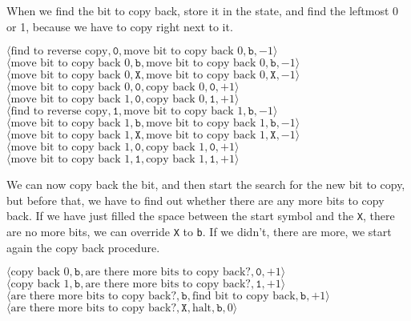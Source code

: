 \documentclass[a4paper,12pt]{article}
\newcommand{\la}{\langle}
\newcommand{\ra}{\rangle}
\begin{document}
    When we find the bit to copy back, store it in the state, and find the leftmost 0 or 1, because we have to copy right next to it.
    \begin{center}
        $\la \textrm{find to reverse copy}, \texttt{0}, \textrm{move bit to copy back 0}, \texttt{b}, -1 \ra$\\
        $\la \textrm{move bit to copy back 0}, \texttt{b}, \textrm{move bit to copy back 0}, \texttt{b}, -1 \ra$\\
        $\la \textrm{move bit to copy back 0}, \texttt{X}, \textrm{move bit to copy back 0}, \texttt{X}, -1 \ra$\\
        $\la \textrm{move bit to copy back 0}, \texttt{0}, \textrm{copy back 0}, \texttt{0}, +1 \ra$\\
        $\la \textrm{move bit to copy back 1}, \texttt{0}, \textrm{copy back 0}, \texttt{1}, +1 \ra$\\
        $\la \textrm{find to reverse copy}, \texttt{1}, \textrm{move bit to copy back 1}, \texttt{b}, -1 \ra$\\
        $\la \textrm{move bit to copy back 1}, \texttt{b}, \textrm{move bit to copy back 1}, \texttt{b}, -1 \ra$\\
        $\la \textrm{move bit to copy back 1}, \texttt{X}, \textrm{move bit to copy back 1}, \texttt{X}, -1 \ra$\\
        $\la \textrm{move bit to copy back 1}, \texttt{0}, \textrm{copy back 1}, \texttt{0}, +1 \ra$\\
        $\la \textrm{move bit to copy back 1}, \texttt{1}, \textrm{copy back 1}, \texttt{1}, +1 \ra$\\
    \end{center}
    We can now copy back the bit, and then start the search for the new bit to copy, but before that, we have to find out whether there are any more bits to copy back. If we have just filled the space between the start symbol and the \texttt{X}, there are no more bits, we can override \texttt{X} to \texttt{b}. If we didn't, there are more, we start again the copy back procedure.
    \begin{center}
        $\la \textrm{copy back 0}, \texttt{b}, \textrm{are there more bits to copy back?}, \texttt{0}, +1 \ra$\\
        $\la \textrm{copy back 1}, \texttt{b}, \textrm{are there more bits to copy back?}, \texttt{1}, +1 \ra$\\
        $\la \textrm{are there more bits to copy back?}, \texttt{b}, \textrm{find bit to copy back}, \texttt{b}, +1 \ra$\\
        $\la \textrm{are there more bits to copy back?}, \texttt{X}, \textrm{halt}, \texttt{b}, 0 \ra$\\
    \end{center}
\end{document}
